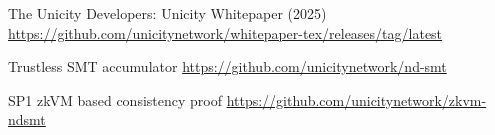 \documentclass{llncs}
\begin{document}


\begin{thebibliography}{99}

 The Unicity Developers: Unicity Whitepaper (2025) \url{https://github.com/unicitynetwork/whitepaper-tex/releases/tag/latest}

 Trustless SMT accumulator \url{https://github.com/unicitynetwork/nd-smt}

 SP1 zkVM based consistency proof \url{https://github.com/unicitynetwork/zkvm-ndsmt}








\end{thebibliography}
\end{document}
